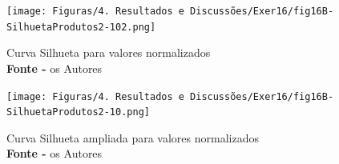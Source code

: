 \begin{figure}[H]
    \centering
    \texttt{[image: Figuras/4. Resultados e Discussões/Exer16/fig16B-SilhuetaProdutos2-102.png]}
    \caption{Curva Silhueta para valores normalizados\\ \textbf{Fonte -} os Autores}
    \label{fig: Matriz de dispersão colorida por variedade de trigo.}
\end{figure}

\begin{figure}[H]
    \centering
    \texttt{[image: Figuras/4. Resultados e Discussões/Exer16/fig16B-SilhuetaProdutos2-10.png]}
    \caption{Curva Silhueta ampliada para valores normalizados\\ \textbf{Fonte -} os Autores}
    \label{fig: Matriz de dispersão colorida por variedade de trigo.}
\end{figure}